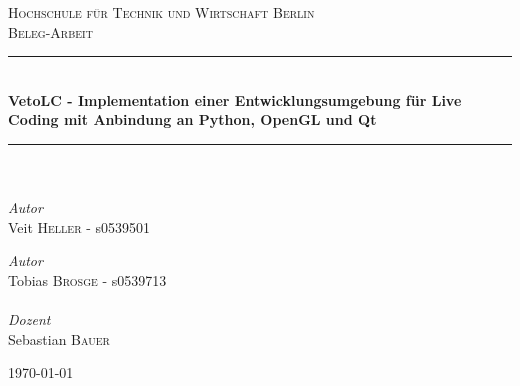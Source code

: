 \begin{titlepage}
\begin{center}


\textsc{\Large Hochschule für Technik und Wirtschaft Berlin}\\[1.5cm]

\textsc{\Large Beleg-Arbeit}\\[0.5cm]


\newcommand{\HRule}{\rule{\linewidth}{0.5mm}}
\HRule \\[0.4cm]
{ \huge \bfseries VetoLC - Implementation einer Entwicklungsumgebung für Live Coding mit Anbindung an Python, OpenGL und Qt}\\[0.4cm]

\HRule \\[1.5cm]

\paragraph{}
\begin{minipage}{0.4\textwidth}
\begin{flushleft} \large
\emph{Autor}\\
Veit \textsc{Heller} - s0539501
\end{flushleft}
\end{minipage}
\hfill
\begin{minipage}{0.4\textwidth}
\begin{flushright} \large
\emph{Autor}\\
Tobias \textsc{Brosge} - s0539713
\end{flushright}
\end{minipage}
\paragraph{}
\paragraph{}
\begin{minipage}{0.4\textwidth}
\begin{center} \large
\emph{Dozent}\\
Sebastian \textsc{Bauer} 
\end{center}
\end{minipage}


\vfill

{\large \today}

\end{center}

\end{titlepage}
